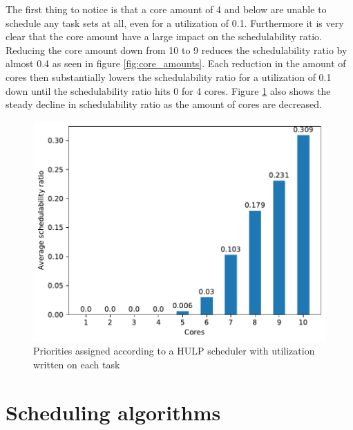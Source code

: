\documentclass{kththesis}
\begin{document}
The first thing to notice is that a core amount of 4 and below are unable to schedule any task sets
at all, even for a utilization of 0.1. Furthermore it is very clear that the core amount have a
large impact on the schedulability ratio. Reducing the core amount down from 10 to 9 reduces the
schedulability ratio by almost 0.4 as seen in figure \ref{fig:core_amounts}. Each reduction in the
amount of cores then substantially lowers the schedulability ratio for a utilization of 0.1 down
until the schedulability ratio hits 0 for 4 cores. Figure \ref{fig:core_amounts_averages} also shows
the steady decline in schedulability ratio as the amount of cores are decreased.

\begin{figure}[H]

    \centering

    \includegraphics[width=1.0\linewidth]{images/core_amounts_averages.pdf}

    \caption{Priorities assigned according to a HULP scheduler with utilization written on each task}

    \label{fig:core_amounts_averages}

\end{figure}

\section{Scheduling algorithms} \label{sec:results_scheduling_algorithms}
\end{document}
